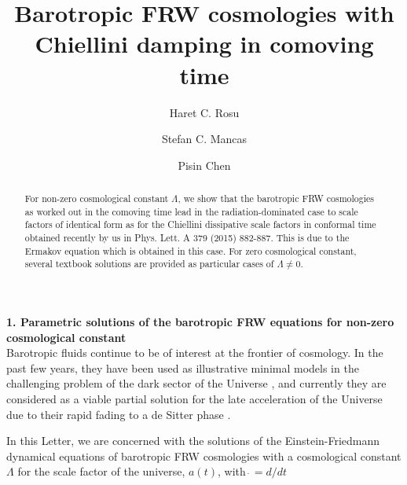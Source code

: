 \documentclass[
showkeys,
preprintnumbers,amsmath,amssymb,APS]{revtex4}
\begin{document}
\title{Barotropic FRW cosmologies with Chiellini damping in comoving time}

\author{Haret C. Rosu}

\author{Stefan C. Mancas }

\author{Pisin Chen}

\begin{abstract}
For non-zero cosmological constant $\Lambda$, we show that the barotropic FRW cosmologies as worked out in the comoving time lead in the radiation-dominated case to scale factors of identical form as for the Chiellini dissipative scale factors in conformal time obtained recently by us in Phys. Lett. A 379 (2015) 882-887. This is due to the Ermakov equation which is obtained in this case. For zero cosmological constant, several textbook solutions are provided as particular cases of $\Lambda\neq 0$.
\end{abstract}


\maketitle

{\bf 1. Parametric solutions of the barotropic FRW equations for non-zero cosmological constant}\\

Barotropic fluids continue to be of interest at the frontier of cosmology. In the past few years, they have been used as illustrative minimal models in the challenging problem of the dark sector of the Universe \cite{0}, and currently they are considered as a viable partial solution for the late acceleration of the Universe due to their rapid fading to a de Sitter phase \cite{00}.

In this Letter, we are concerned with the solutions of the Einstein-Friedmann dynamical equations of barotropic FRW cosmologies with a cosmological constant $\Lambda $ for the scale factor of the universe, $a(t)$, with $\dot \,=d/dt$
\end{document}
